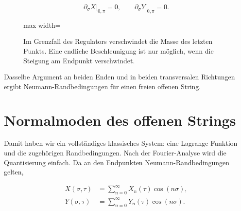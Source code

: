 \begin{equation}
  \left.\partial_\sigma X\right|_{0,\pi}=0,
  \qquad
  \left.\partial_\sigma Y\right|_{0,\pi}=0.
  \label{eq:l02-open-neumann}
\end{equation}

\begin{figure}[H]
  \centering
  \begin{adjustbox}{max width=\linewidth}
  \end{adjustbox}
  \caption{Im Grenzfall des Regulators verschwindet die Masse des letzten Punkts. Eine endliche Beschleunigung ist nur möglich, wenn die Steigung am Endpunkt verschwindet.}
  \label{fig:l02-neumann-redraw}
\end{figure}

Dasselbe Argument an beiden Enden und in beiden transversalen Richtungen ergibt Neumann-Randbedingungen für einen freien offenen String.

\section{Normalmoden des offenen Strings}

Damit haben wir ein vollständiges klassisches System: eine Lagrange-Funktion und die zugehörigen Randbedingungen. Nach der Fourier-Analyse wird die Quantisierung einfach. Da an den Endpunkten Neumann-Randbedingungen gelten,

\begin{align}
  X(\sigma,\tau)
  &=
  \sum_{n=0}^{\infty}X_n(\tau)\cos(n\sigma),
  \label{eq:l02-X-expansion}\\
  Y(\sigma,\tau)
  &=
  \sum_{n=0}^{\infty}Y_n(\tau)\cos(n\sigma).
  \label{eq:l02-Y-expansion}
\end{align}


